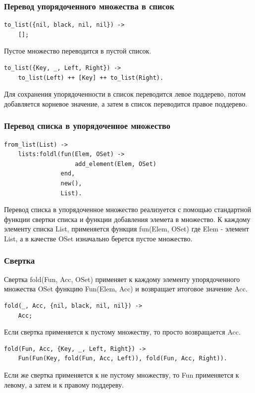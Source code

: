		\subsubsection{Перевод упорядоченного множества в список}
			\begin{lstlisting}
to_list({nil, black, nil, nil}) ->
    [];
			\end{lstlisting}
			Пустое множество переводится в пустой список.
			\begin{lstlisting}
to_list({Key, _, Left, Right}) ->
    to_list(Left) ++ [Key] ++ to_list(Right).
			\end{lstlisting}
			Для сохранения упорядоченности в список переводится левое поддерево, потом 
			добавляется корневое значение, а затем в список переводится правое поддерево.
			
		\subsubsection{Перевод списка в упорядоченное множество}
			\begin{lstlisting}
from_list(List) ->
    lists:foldl(fun(Elem, OSet) -> 
                    add_element(Elem, OSet) 
                end, 
                new(), 
                List).
			\end{lstlisting}			
			Перевод списка в упорядоченное множество реализуется с помощью стандартной 
			функции свертки списка и функции добавления элемета в множество. К каждому 
			элементу списка List, применяется функция fun(Elem, OSet) где Elem - элемент
			List, а в качестве OSet изначально берется пустое множество.
			
		\subsubsection{Свертка}
			Свертка fold(Fun, Acc, OSet) применяет к каждому элементу упорядоченного
			множества OSet функцию Fun(Elem, Acc) и возвращает итоговое значение Acc.
			\begin{lstlisting}
fold(_, Acc, {nil, black, nil, nil}) ->
    Acc;	
			\end{lstlisting}
			Если свертка применяется к пустому множеству, то просто возвращается Acc.
			\begin{lstlisting}
fold(Fun, Acc, {Key, _, Left, Right}) ->
    Fun(Fun(Key, fold(Fun, Acc, Left)), fold(Fun, Acc, Right)).
			\end{lstlisting}
			Если же свертка применяется к не пустому множеству, то Fun применяется к левому, 
			а затем и к правому поддереву.
		
